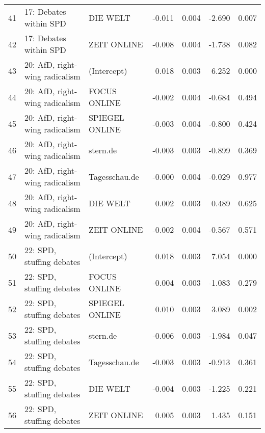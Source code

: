 \begin{table}[ht]
{\begin{tabular}{rllrrrr}
  41 & 17: Debates within SPD & DIE WELT & -0.011 & 0.004 & -2.690 & 0.007 \\ 
  42 & 17: Debates within SPD & ZEIT ONLINE & -0.008 & 0.004 & -1.738 & 0.082 \\ 
  43 & 20: AfD, right-wing radicalism & (Intercept) & 0.018 & 0.003 & 6.252 & 0.000 \\ 
  44 & 20: AfD, right-wing radicalism & FOCUS ONLINE & -0.002 & 0.004 & -0.684 & 0.494 \\ 
  45 & 20: AfD, right-wing radicalism & SPIEGEL ONLINE & -0.003 & 0.004 & -0.800 & 0.424 \\ 
  46 & 20: AfD, right-wing radicalism & stern.de & -0.003 & 0.003 & -0.899 & 0.369 \\ 
  47 & 20: AfD, right-wing radicalism & Tagesschau.de & -0.000 & 0.004 & -0.029 & 0.977 \\ 
  48 & 20: AfD, right-wing radicalism & DIE WELT & 0.002 & 0.003 & 0.489 & 0.625 \\ 
  49 & 20: AfD, right-wing radicalism & ZEIT ONLINE & -0.002 & 0.004 & -0.567 & 0.571 \\ 
  50 & 22: SPD, stuffing debates & (Intercept) & 0.018 & 0.003 & 7.054 & 0.000 \\ 
  51 & 22: SPD, stuffing debates & FOCUS ONLINE & -0.004 & 0.003 & -1.083 & 0.279 \\ 
  52 & 22: SPD, stuffing debates & SPIEGEL ONLINE & 0.010 & 0.003 & 3.089 & 0.002 \\ 
  53 & 22: SPD, stuffing debates & stern.de & -0.006 & 0.003 & -1.984 & 0.047 \\ 
  54 & 22: SPD, stuffing debates & Tagesschau.de & -0.003 & 0.003 & -0.913 & 0.361 \\ 
  55 & 22: SPD, stuffing debates & DIE WELT & -0.004 & 0.003 & -1.225 & 0.221 \\ 
  56 & 22: SPD, stuffing debates & ZEIT ONLINE & 0.005 & 0.003 & 1.435 & 0.151 \\ 
   \hline
\end{tabular}
}
\end{table}
